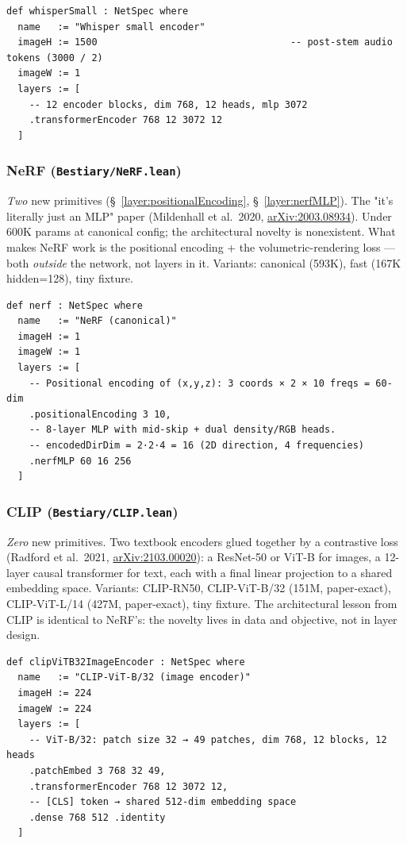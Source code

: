\begin{verbatim}
def whisperSmall : NetSpec where
  name   := "Whisper small encoder"
  imageH := 1500                                  -- post-stem audio tokens (3000 / 2)
  imageW := 1
  layers := [
    -- 12 encoder blocks, dim 768, 12 heads, mlp 3072
    .transformerEncoder 768 12 3072 12
  ]
\end{verbatim}

\subsubsection*{NeRF (\texttt{Bestiary/NeRF.lean})}
\emph{Two} new primitives (\S~\ref{layer:positionalEncoding},
\S~\ref{layer:nerfMLP}). The "it's literally just an MLP" paper
(Mildenhall et al.\ 2020,
\href{https://arxiv.org/abs/2003.08934}{arXiv:2003.08934}). Under 600K params at canonical
config; the architectural novelty is nonexistent. What makes NeRF work
is the positional encoding + the volumetric-rendering loss ---
both \emph{outside} the network, not layers in it. Variants:
canonical (593K), fast (167K hidden=128), tiny fixture.

\begin{verbatim}
def nerf : NetSpec where
  name   := "NeRF (canonical)"
  imageH := 1
  imageW := 1
  layers := [
    -- Positional encoding of (x,y,z): 3 coords × 2 × 10 freqs = 60-dim
    .positionalEncoding 3 10,
    -- 8-layer MLP with mid-skip + dual density/RGB heads.
    -- encodedDirDim = 2·2·4 = 16 (2D direction, 4 frequencies)
    .nerfMLP 60 16 256
  ]
\end{verbatim}

\subsubsection*{CLIP (\texttt{Bestiary/CLIP.lean})}
\emph{Zero} new primitives. Two textbook encoders glued together by a
contrastive loss (Radford et al.\ 2021,
\href{https://arxiv.org/abs/2103.00020}{arXiv:2103.00020}): a ResNet-50 or ViT-B for images, a 12-layer causal
transformer for text, each with a final linear projection to a shared
embedding space. Variants: CLIP-RN50, CLIP-ViT-B/32 (151M, paper-exact),
CLIP-ViT-L/14 (427M, paper-exact), tiny fixture. The architectural
lesson from CLIP is identical to NeRF's: the novelty lives in data and
objective, not in layer design.

\begin{verbatim}
def clipViTB32ImageEncoder : NetSpec where
  name   := "CLIP-ViT-B/32 (image encoder)"
  imageH := 224
  imageW := 224
  layers := [
    -- ViT-B/32: patch size 32 → 49 patches, dim 768, 12 blocks, 12 heads
    .patchEmbed 3 768 32 49,
    .transformerEncoder 768 12 3072 12,
    -- [CLS] token → shared 512-dim embedding space
    .dense 768 512 .identity
  ]
\end{verbatim}

